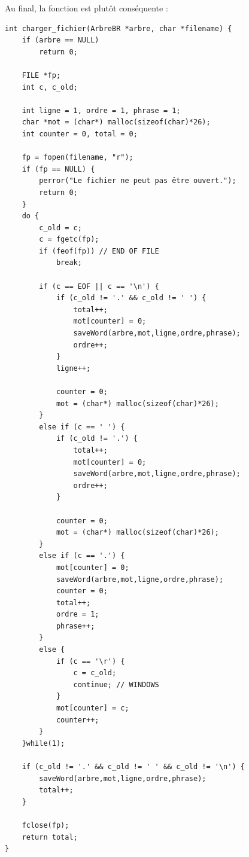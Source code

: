 Au final, la fonction est plutôt conséquente :
\begin{lstlisting}
int charger_fichier(ArbreBR *arbre, char *filename) {
    if (arbre == NULL)
        return 0;

    FILE *fp;
    int c, c_old;

    int ligne = 1, ordre = 1, phrase = 1;
    char *mot = (char*) malloc(sizeof(char)*26);
    int counter = 0, total = 0;

    fp = fopen(filename, "r");
    if (fp == NULL) {
        perror("Le fichier ne peut pas être ouvert.");
        return 0;
    }
    do {
        c_old = c;
        c = fgetc(fp);
        if (feof(fp)) // END OF FILE
            break;

        if (c == EOF || c == '\n') {
            if (c_old != '.' && c_old != ' ') {
                total++;
                mot[counter] = 0;
                saveWord(arbre,mot,ligne,ordre,phrase);
                ordre++;
            }
            ligne++;

            counter = 0;
            mot = (char*) malloc(sizeof(char)*26);
        }
        else if (c == ' ') {
            if (c_old != '.') {
                total++;
                mot[counter] = 0;
                saveWord(arbre,mot,ligne,ordre,phrase);
                ordre++;
            }

            counter = 0;
            mot = (char*) malloc(sizeof(char)*26);
        }
        else if (c == '.') {
            mot[counter] = 0;
            saveWord(arbre,mot,ligne,ordre,phrase);
            counter = 0;
            total++;
            ordre = 1;
            phrase++;
        }
        else {
            if (c == '\r') {
                c = c_old;
                continue; // WINDOWS
            }
            mot[counter] = c;
            counter++;
        }
    }while(1);

    if (c_old != '.' && c_old != ' ' && c_old != '\n') {
        saveWord(arbre,mot,ligne,ordre,phrase);
        total++;
    }

    fclose(fp);
    return total;
}
\end{lstlisting}

